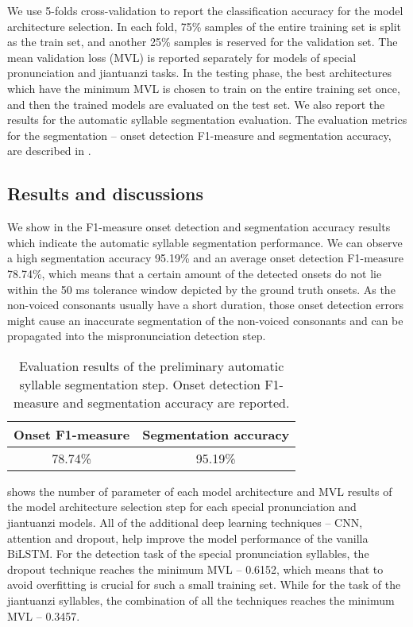 We use 5-folds cross-validation to report the classification accuracy for the model architecture selection. In each fold, 75\% samples of the entire training set is split as the train set, and another 25\% samples is reserved for the validation set. The mean validation loss (MVL) is reported separately for models of special pronunciation and jiantuanzi tasks. In the testing phase, the best architectures which have the minimum MVL is chosen to train on the entire training set once, and then the trained models are evaluated on the test set. We also report the results for the automatic syllable segmentation evaluation. The evaluation metrics for the segmentation -- onset detection F1-measure and segmentation accuracy, are described in . 

\subsection{Results and discussions}

We show in  the F1-measure onset detection and segmentation accuracy results which indicate the automatic syllable segmentation performance. We can observe a high segmentation accuracy 95.19\% and an average onset detection F1-measure 78.74\%, which means that a certain amount of the detected onsets do not lie within the 50 ms tolerance window depicted by the ground truth onsets. As the non-voiced consonants usually have a short duration, those onset detection errors might cause an inaccurate segmentation of the non-voiced consonants and can be propagated into the mispronunciation detection step. 

\begin{table}[ht!]
\centering
\caption{Evaluation results of the preliminary automatic syllable segmentation step. Onset detection F1-measure and segmentation accuracy are reported.}
\label{tab:ch6:syllable_segmentation_results}
\begin{tabular}{cc}
\toprule
Onset F1-measure & Segmentation accuracy \\
\midrule
78.74\% & 95.19\% \\
\bottomrule
\end{tabular}
\end{table}

 shows the number of parameter of each model architecture and MVL results of the model architecture selection step for each special pronunciation and jiantuanzi models. All of the additional deep learning techniques -- CNN, attention and dropout, help improve the model performance of the vanilla BiLSTM. For the detection task of the special pronunciation syllables, the dropout technique reaches the minimum MVL -- 0.6152, which means that to avoid overfitting is crucial for such a small training set. While for the task of the jiantuanzi syllables, the combination of all the techniques reaches the minimum MVL -- 0.3457.  


